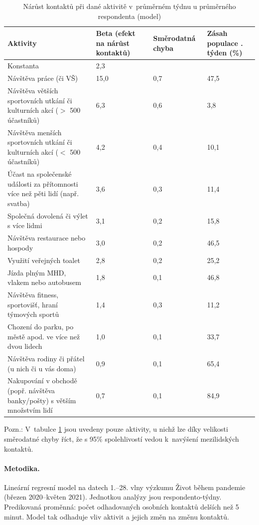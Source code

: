 \begin{table}[ht]
    \centering
    \caption{Nárůst kontaktů při dané aktivitě v průměrném týdnu u průměrného respondenta (model)}
    
\begin{tabular}{ p{5cm} p{2cm} p{2cm} p{2cm}  }
 \hline
 Aktivity & Beta \newline (efekt na \newline nárůst kontaktů) & Směrodatná \newline chyba & Zásah populace \newline 23. týden (\%)\\
 \hline
 Konstanta   & 2,3    & & \\
 Návštěva práce (či VŠ) & 15,0 & 0,7 &47,5\\
 Návštěva větších sportovních utkání či kulturních akcí ($>$ 500 účastníků) &
6,3 &
0,6 &
3,8\\
  Návštěva menších sportovních utkání či kulturních akcí ($<$ 500 účastníků)&
4,2&
0,4&
10,1\\
  Účast na společenské události za přítomnosti více než pěti lidí (např. svatba)&
3,6&
0,3&
11,4\\
  Společná dovolená či výlet s více lidmi&
3,1&
0,2&
15,8\\
  Návštěva restaurace nebo hospody&
3,0&
0,2&
46,5\\
  Využití veřejných toalet&
2,8&
0,2&
25,2\\
  Jízda plným MHD, vlakem nebo autobusem&
1,8&
0,1&
46,8\\
  Návštěva fitness, sportovišť, hraní týmových sportů&
1,4&
0,3&
11,2\\
  Chození do parku, po městě apod. ve více než dvou lidech&
1,0&
0,1&
33,7\\
  Návštěva rodiny či přátel (u nich či u vás doma)&
0,9&
0,1&
65,4\\
  Nakupování v obchodě (popř. návštěva banky/pošty) s větším množstvím lidí&
0,7&
0,1&
84,9\\
 \hline
\end{tabular}
    
    \label{tab:narust-kontaktu}
\end{table}

Pozn.: V tabulce \ref{tab:narust-kontaktu} jsou uvedeny pouze aktivity, u nichž lze díky velikosti směrodatné chyby říct, že s 95\% spolehlivostí vedou k navýšení mezilidských kontaktů.

\vspace{1em}
\paragraph{Metodika.} Lineární regresní model na datech 1.--28. vlny výzkumu Život během pandemie (březen 2020–květen 2021). Jednotkou analýzy jsou respondento-týdny. Predikovaná proměnná: počet odhadovaných osobních kontaktů delších než 5 minut. Model tak odhaduje vliv aktivit a jejich změn na změnu kontaktů.

